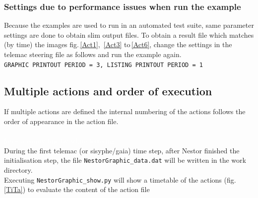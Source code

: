 \subsubsection{Settings due to performance issues when run the example}
Because the examples are used to run in an automated test suite, same parameter
settings are done to obtain slim output files.
To obtain a result file which matches (by time) the images fig.\,\ref{Act1}, \,\ref{Act3} to\,\ref{Act6}, change the settings in the telemac steering file
as follows and run the example again.
\\ \texttt{\small{GRAPHIC PRINTOUT PERIOD = 3,  LISTING PRINTOUT PERIOD = 1}}

\subsection{Multiple actions and order of execution}\label{ssec:E4OrderExc}
If multiple actions are defined the internal numbering of the actions follows the order of appearance in the action file.\\
\\
\textcolor{white}{force a empty line by white lettering}\\ %

During the first telemac (or sisyphe/gaia) time step, after Nestor finished the initialisation step,
the file \texttt{NestorGraphic\_data.dat} will be written in the work directory.\\
Executing \texttt{NestorGraphic\_show.py} will show a timetable of the actions (fig.\,\ref{TiTa})
to evaluate the content of the action file

